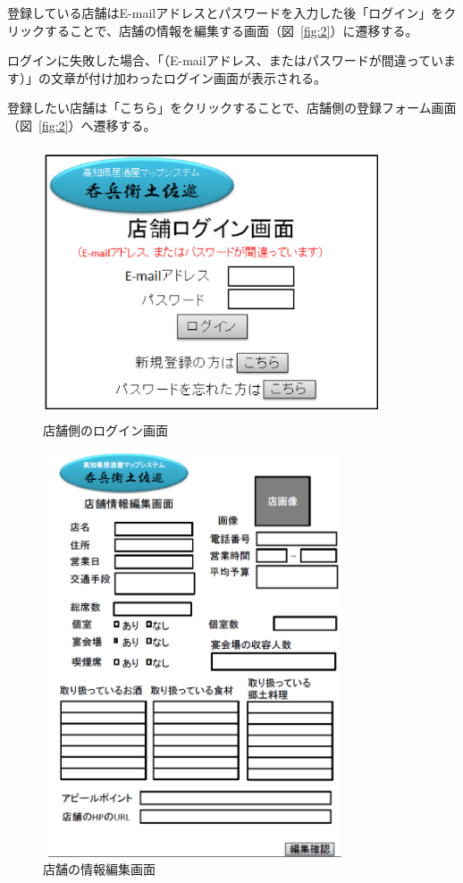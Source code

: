 \documentclass[a4j,titlepage]{jarticle}
\begin{document}
登録している店舗はE-mailアドレスとパスワードを入力した後「ログイン」をクリックすることで、店舗の情報を編集する画面（図~\ref{fig:2}）に遷移する。



ログインに失敗した場合、「（E-mailアドレス、またはパスワードが間違っています）」の文章が付け加わったログイン画面が表示される。



登録したい店舗は「こちら」をクリックすることで、店舗側の登録フォーム画面（図~\ref{fig:2}）へ遷移する。



\begin {figure}[!htbp]
    \begin{center}
    \includegraphics [height=8cm, width=10cm]{27.eps}
    \caption {店舗側のログイン画面}
    \label {fig:27}
    \end{center}
\end {figure}



\begin {figure}[!htbp]
    \begin{center}
    \includegraphics [height=12cm, width=9cm]{28.eps}
    \caption {店舗の情報編集画面}
    \label {fig:28}
    \end{center}
\end {figure}
\end{document}
